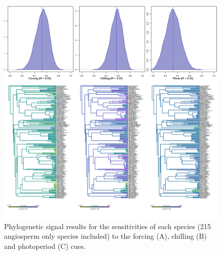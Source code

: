 \documentclass{article}\usepackage[]{graphicx}\usepackage[]{color}
\begin{document}
\begin{figure} [H]
  \begin{center}
  \includegraphics[width=14cm]{..//..//analyses/phylogeny/figures/Sensitivities_phylosig_spslev215angio.png}
  \caption{Phylogenetic signal results for the sensitivities of each species (215 angiosperm only species included) to the forcing (A), chilling (B) and photoperiod (C) cues.}
  \label{fig:phylosig_215spp}
  \end{center}
\end{figure}
\end{document}
